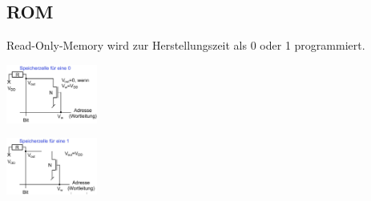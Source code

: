 \subsection{ROM}
Read-Only-Memory wird zur Herstellungszeit als 0 oder 1 programmiert.
\begin{center}
    \begin{minipage}{0.45\linewidth}
        \includegraphics[width = 30mm]{images/rom_0.JPG}
    \end{minipage}
    \hfill
    \begin{minipage}{0.45\linewidth}
        \includegraphics[width = 30mm]{images/rom_1.JPG}
    \end{minipage}
\end{center}